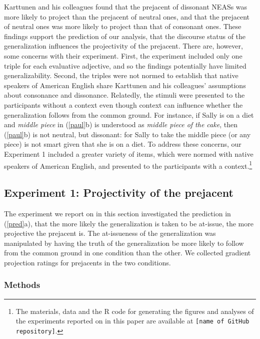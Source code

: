 \documentclass[11pt,fleqn]{article}
\newcommand{\6}{\mbox{$[\hspace*{-.6mm}[$}}
\newcommand{\9}{\mbox{$]\hspace*{-.6mm}]$}}
\begin{document}
Karttunen and his colleagues found that the prejacent of dissonant NEASs was more likely to project than the prejacent of neutral ones, and that the prejacent of neutral ones was more likely to project than that of consonant ones. These findings support the prediction of our analysis, that the discourse status of the generalization influences the projectivity of the prejacent. There are, however, some concerns with their experiment. First, the experiment included only one triple for each evaluative adjective, and so the findings potentially have limited generalizability. Second, the triples were not normed to establish that native speakers of American English share Karttunen and his colleagues' assumptions about consonance and dissonance. Relatedly, the stimuli were
presented to the participants without a context even though context can influence whether the generalization follows from the common ground. For instance, if Sally is on a diet and {\em middle piece} in (\ref{paul}b) is understood as {\em middle piece of the cake}, then (\ref{paul}b) is not neutral, but dissonant: for Sally to take the middle piece (or any piece) is not smart given that she is on a diet. To address these concerns, our Experiment 1 included a greater variety of items, which were normed with native speakers of American English, and presented to the participants with a context.\footnote{\label{f-git}The
materials, data and the R code for generating the figures and analyses of the experiments reported on in this paper are available at {\tt [name of GitHub repository]}.} 

\subsection{Experiment 1: Projectivity of the prejacent}\label{s31}

The experiment we report on in this section investigated the prediction in (\ref{pred}a), that the more likely the generalization is taken to be at-issue, the more projective the prejacent is. The at-issueness of the generalization was manipulated by having the truth of the generalization be more likely to follow from the common ground in one condition than the other. We collected gradient projection ratings for prejacents in the two conditions.

\subsubsection{Methods}
\end{document}
